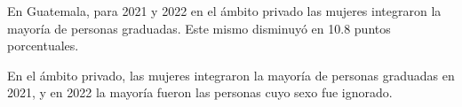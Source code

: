 En Guatemala, para 2021 y 2022 en el ámbito privado las mujeres integraron la mayoría de personas graduadas. Este mismo disminuyó en 10.8 puntos porcentuales. 

En el ámbito privado, las mujeres integraron la mayoría de personas graduadas en 2021, y en 2022 la mayoría fueron las personas cuyo sexo fue ignorado.